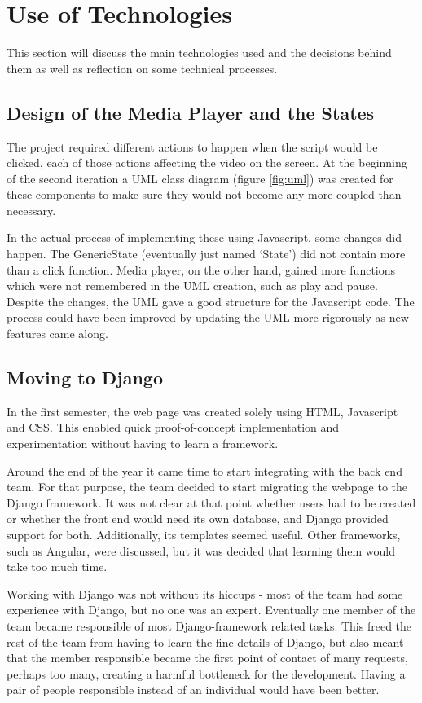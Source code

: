 \documentclass{l3proj}
\begin{document}
\section{Use of Technologies }
\label{development}
This section will discuss the main technologies used and the decisions behind them as well as reflection on some technical processes.

\subsection{Design of the Media Player and the States}

The project required different actions to happen when the script would be clicked, each of those actions affecting the video on the screen. At the beginning of the second iteration a UML class diagram (figure \ref{fig:uml}) was created for these components to make sure they would not become any more coupled than necessary.

In the actual process of implementing these using Javascript, some changes did happen. The GenericState (eventually just named ‘State’) did not contain more than a click function. Media player, on the other hand, gained more functions which were not remembered in the UML creation, such as play and pause. Despite the changes, the UML gave a good structure for the Javascript code. The process could have been improved by updating the UML more rigorously as new features came along.


\subsection{Moving to Django}
In the first semester, the web page was created solely using HTML, Javascript and CSS. This enabled quick proof-of-concept implementation and experimentation without having to learn a framework.

Around the end of the year it came time to start integrating with the back end team. For that purpose, the team decided to start migrating the webpage to the Django framework. It was not clear at that point whether users had to be created or whether the front end would need its own database, and Django provided support for both. Additionally, its templates seemed useful. Other frameworks, such as Angular, were discussed, but it was decided that learning them would take too much time.  

Working with Django was not without its hiccups - most of the team had some experience with Django, but no one was an expert. Eventually one member of the team became responsible of most Django-framework related tasks. This freed the rest of the team from having to learn the fine details of Django, but also meant that the member responsible became the first point of contact of many requests, perhaps too many, creating a harmful bottleneck for the development. Having a pair of people responsible instead of an individual would have been better.
\end{document}
